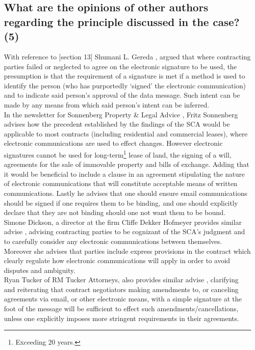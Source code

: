 \documentclass[11pt]{article}
\begin{document}
\subsection{What are the opinions of other authors regarding the principle discussed in the case? (5)}
\label{sec:orgddd3b9f}

With reference to [section 13]\cite{rsa02_elect_comm_trans_act} Shumani L. Gereda
\cite{gereda16_elec_comms_trans_act}, argued that where contracting parties failed
or neglected to agree on the electronic signature to be used, the presumption is
that the requirement of a signature is met if a method is used to identify the
person (who has purportedly `signed' the electronic communication) and to
indicate said person's approval of the data message. Such intent can be made by
any means from which said person's intent can be inferred.\\

In the newsletter for Sonnenberg Property \& Legal Advice \cite{fritz_sonnenberg},
Fritz Sonnenberg advises how the precedent established by the  findings of the
SCA would be applicable to most contracts (including residential and commercial
leases), where electronic communications are used to effect changes. However
electronic signatures cannot be used for long-term\footnote{Exceeding 20 years.}
lease of land, the signing of a will, agreements for the sale of immovable
property and bills of exchange. Adding that it would be beneficial to include a
clause in an agreement stipulating the nature of electronic communications that
will constitute acceptable means of written communications. Lastly he advises
that one should ensure email communications should be signed if one requires
them to be binding, and one should explicitly declare that they are not binding
should one not want them to be bound.\\

Simone Dickson, a director at the firm Cliffe Dekker Hofmeyer provides similar
advise \cite{simone_dickson}, advising contracting parties to be cognizant of the
SCA's judgment and to carefully consider any electronic communications between
themselves. Moreover she advises that parties include express provisions in the
contract which clearly regulate how electronic communications will apply in
order to avoid disputes and ambiguity.\\

Ryan Tucker of RM Tucker Attorneys, also provides similar advise \cite{rmtucker},
clarifying and reiterating that contract negotiators making amendments to, or
canceling agreements via email, or other electronic means, with a simple
signature at the foot of the message will be sufficient to effect such
amendments/cancellations, unless one explicitly imposes more stringent
requirements in their agreements.\\
\end{document}
